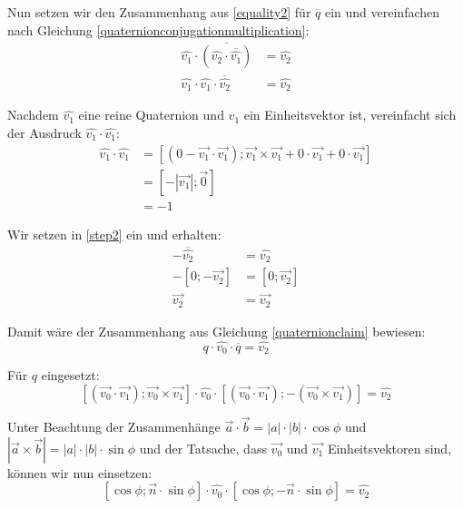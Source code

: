 Nun setzen wir den Zusammenhang aus \ref{equality2} für $\overline{q}$ ein und vereinfachen nach Gleichung \ref{quaternionconjugationmultiplication}:
\begin{equation}
\begin{split}
 \label{step2}
 \hat{v_1} \cdot \overline{\left( \hat{v_2} \cdot \overline{\hat{v_1}} \right)} &= \hat{v_2} \\
 \hat{v_1} \cdot \hat{v_1} \cdot \overline{\hat{v_2}} &= \hat{v_2}
\end{split}
\end{equation}

Nachdem $\hat{v_1}$ eine reine Quaternion und $v_1$ ein Einheitsvektor ist, vereinfacht sich der Ausdruck $\hat{v_1} \cdot \hat{v_1}$:
\begin{equation}
\begin{split}
 \hat{v_1} \cdot \hat{v_1} &= \left[ \left( 0 - \vec{v_1} \cdot \vec{v_1} \right); \vec{v_1} \times \vec{v_1} + 0 \cdot \vec{v_1} + 0 \cdot \vec{v_1} \right] \\
 &= \left[ -\left| \vec{v_1} \right|; \vec 0 \right] \\
 &= -1
\end{split}
\end{equation}

Wir setzen in \ref{step2} ein und erhalten:
\begin{equation}
\begin{split}
 -\overline{\hat{v_2}} &= \hat{v_2} \\
 -\left[ 0; -\vec{v_2} \right] &= \left[ 0; \vec{v_2} \right] \\
 \vec{v_2} &= \vec{v_2}
\end{split}
\end{equation}

Damit wäre der Zusammenhang aus Gleichung \ref{quaternionclaim} bewiesen:
\begin{equation*}
 q \cdot \hat{v_0} \cdot \overline{q} = \hat{v_2}
\end{equation*}

Für $q$ eingesetzt:
\begin{equation*}
 \left[ ( \vec{v_0} \cdot \vec{v_1} ); \vec{v_0} \times \vec{v_1} \right] \cdot \hat{v_0} \cdot \left[ ( \vec{v_0} \cdot \vec{v_1} ); -(\vec{v_0} \times \vec{v_1} ) \right] = \hat{v_2}
\end{equation*} 

Unter Beachtung der Zusammenhänge $\vec a \cdot \vec b = \left| a \right| \cdot \left| b \right| \cdot \cos \phi$ und $\left| \vec a \times \vec b \right| = \left| a \right| \cdot \left| b \right| \cdot \sin \phi$ und der Tatsache, dass $\vec{v_0}$ und $\vec{v_1}$ Einheitsvektoren sind, können wir nun einsetzen:
\begin{equation}
 \left[ \cos \phi; \vec n \cdot \sin \phi \right] \cdot \hat{v_0} \cdot \left[ \cos \phi; -\vec n \cdot \sin \phi \right] = \hat{v_2}
\end{equation}

